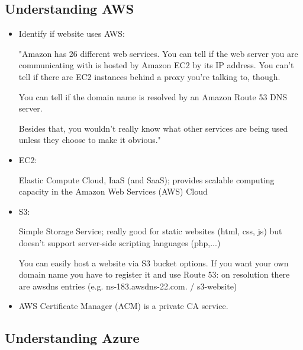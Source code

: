 \documentclass[12pt]{article}
\begin{document}
\newpage
\subsection*{Understanding AWS}
\begin{itemize}
    \item Identify if website uses AWS:
    
    "Amazon has 26 different web services. You can tell if the web server you are communicating with is hosted by Amazon EC2 by its IP address. You can't tell if there are EC2 instances behind a proxy you're talking to, though.

    You can tell if the domain name is resolved by an Amazon Route 53 DNS server.

    Besides that, you wouldn't really know what other services are being used unless they choose to make it obvious."
    
    \item EC2:
    
    Elastic Compute Cloud, IaaS (and SaaS); provides scalable computing capacity in the Amazon Web Services (AWS) Cloud
    
    \item S3:
    
    Simple Storage Service; really good for static websites (html, css, js) but doesn't support server-side scripting languages (php,...)
    
    You can easily host a website via S3 bucket options. If you want your own domain name you have to register it and use Route 53: on resolution there are awsdns entries (e.g. ns-183.awsdns-22.com. / s3-website)
    
    \item AWS Certificate Manager (ACM) is a private CA service.
    
\end{itemize}

\subsection*{Understanding Azure}




\newpage
\end{document}
